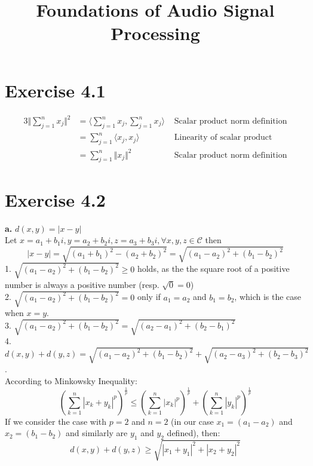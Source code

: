 \documentclass[12pt]{article}
\title{Foundations of Audio Signal Processing\\ \ass}
\author{\auth}
\begin{document}
	\maketitle
	\section*{Exercise 4.1}
	\begin{alignat*}{3}
	\Vert \sum_{j=1}^{n} x_j\Vert^2 &= \langle\sum_{j=1}^{n} x_j, \sum_{j=1}^{n} x_j\rangle & \text{ Scalar product norm definition}\\
	&=\sum_{j=1}^{n} \langle x_j, x_j\rangle & \text{ Linearity of scalar product}\\
	&=\sum_{j=1}^{n} \Vert x_j \Vert^2 & \text{ Scalar product norm definition}
	\end{alignat*}
	\section*{Exercise 4.2}
	\textbf{a.} $d(x,y) = \vert x - y \vert$\\
	Let $x = a_1 + b_1 i, y = a_2 + b_2 i, z = a_3 + b_3 i, \forall x, y, z \in \mathcal{C} $ then
	\begin{equation*}
		\vert x - y \vert = \sqrt{(a_1 + b_1)^2 - (a_2 + b_2)^2} = \sqrt{(a_1 - a_
			2)^2 + (b_1 - b_2)^2}
	\end{equation*}
	1. $\sqrt{(a_1 - a_2)^2 + (b_1 - b_2)^2} \geq 0$ holds, as the the square root of a positive number is always a positive number (resp. $\sqrt0 = 0$)\\
	2. $\sqrt{(a_1 - a_2)^2 + (b_1 - b_2)^2} = 0$ only if $a_1 = a_2$ and $b_1 = b_2$, which is the case when $x=y$.\\
	3. $\sqrt{(a_1 - a_2)^2 + (b_1 - b_2)^2} = \sqrt{(a_2 - a_1)^2 + (b_2 - b_1)^2}$\\
	4. $d(x,y) + d(y,z) = \sqrt{(a_1 - a_2)^2 + (b_1 - b_2)^2} + \sqrt{(a_2 - a_3)^2 + (b_2 - b_3)^2}$.\\
	According to Minkowsky Inequality:
	\begin{equation*}
	\left(\sum _{{k=1}}^{n}|x_{k}+y_{k}|^{p}\right)^{{{\frac  {1}{p}}}}\leq \left(\sum _{{k=1}}^{n}|x_{k}|^{p}\right)^{{{\frac  {1}{p}}}}+\left(\sum _{{k=1}}^{n}|y_{k}|^{p}\right)^{{{\frac  {1}{p}}}}
	\end{equation*}
	If we consider the case with $p=2$ and $n=2$ (in our case $x_1 = (a_1 - a_2)$ and $x_2 = (b_1 - b_2)$ and similarly are $y_1$ and $y_2$ defined), then:
	$$d(x,y) + d(y,z) \geq \sqrt{|x_1 + y_1|^2 + |x_2 + y_2|^2}  $$
\end{document}
